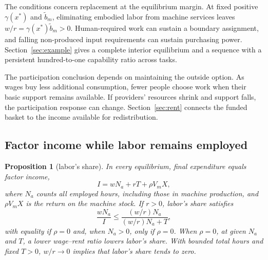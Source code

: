 \documentclass[12pt]{article}
\theoremstyle{plain}
\newtheorem{proposition}{Proposition}
\theoremstyle{definition}
\theoremstyle{remark}
\begin{document}
The conditions concern replacement at the equilibrium margin. At fixed positive $\gamma(x^*)$ and $\widetilde b_m$, eliminating embodied labor from machine services leaves $w/r=\gamma(x^*)\widetilde b_m>0$. Human-required work can sustain a boundary assignment, and falling non-produced input requirements can sustain purchasing power. Section~\ref{sec:example} gives a complete interior equilibrium and a sequence with a persistent hundred-to-one capability ratio across tasks.

The participation conclusion depends on maintaining the outside option. As wages buy less additional consumption, fewer people choose work when their basic support remains available. If providers' resources shrink and support falls, the participation response can change. Section~\ref{sec:rent} connects the funded basket to the income available for redistribution.

\subsection{Factor income while labor remains employed}\label{sec:income}

\begin{proposition}[labor's share]\label{prop:5}
In every equilibrium, final expenditure equals factor income,
\begin{equation}\label{eq:income}
I=wN_a+rT+\rho V_mX,
\end{equation}
where $N_a$ counts all employed hours, including those in machine production, and $\rho V_mX$ is the return on the machine stock. If $r>0$, labor's share satisfies
\begin{equation}\label{eq:15}
\frac{wN_a}{I}\le\frac{(w/r)N_a}{(w/r)N_a+T},
\end{equation}
with equality if $\rho=0$ and, when $N_a>0$, only if $\rho=0$. When $\rho=0$, at given $N_a$ and $T$, a lower wage--rent ratio lowers labor's share. With bounded total hours and fixed $T>0$, $w/r\to0$ implies that labor's share tends to zero.
\end{proposition}
\end{document}
